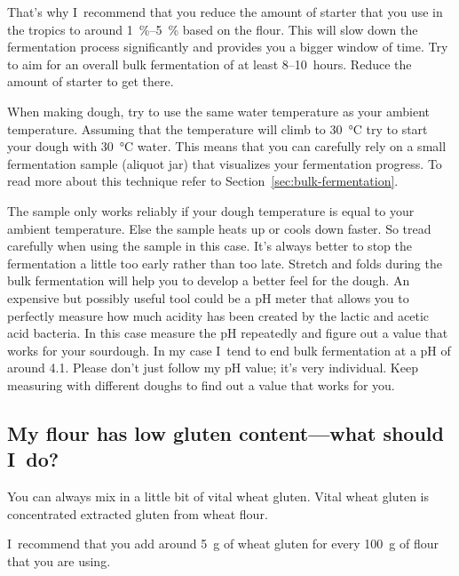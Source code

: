 That's why I~recommend that you reduce the amount of starter
that you use in the tropics to around \qtyrange{1}{5}{\percent}
based on the flour. This will slow down the fermentation
process significantly and provides you a bigger window
of time. Try to aim for an overall bulk fermentation of at
least 8--10~hours. Reduce the amount of starter to get there.

When making dough, try to use the same water temperature
as your ambient temperature. Assuming that the temperature
will climb to \qty{30}{\degreeCelsius} try to start your dough
with \qty{30}{\degreeCelsius} water. This means that you can carefully rely on
a small fermentation sample (aliquot jar) that visualizes your fermentation
progress. To read more about this technique refer
to Section~\ref{sec:bulk-fermentation}.

The sample only works reliably if your dough temperature
is equal to your ambient temperature. Else the sample heats
up or cools down faster. So tread carefully when using
the sample in this case. It's always better to stop
the fermentation a little too early rather than too late.
Stretch and folds during the bulk fermentation
will help you to develop a better feel for
the dough. An expensive but possibly useful tool
could be a pH meter that allows you to perfectly
measure how much acidity has been created by the
lactic and acetic acid bacteria. In this case measure
the pH repeatedly and figure out a value that works
for your sourdough. In my case I~tend to end bulk
fermentation at a pH of around 4.1. Please don't just
follow my pH value; it's very individual. Keep measuring
with different doughs to find out a value that works for you.

\subsection{My flour has low gluten content---what should I~do?}

You can always mix in a little bit of vital wheat gluten. Vital wheat gluten
is concentrated extracted gluten from wheat flour.

I~recommend that you add around \qty{5}{\gram} of wheat gluten for every
\qty{100}{\gram} of flour that you are using.
